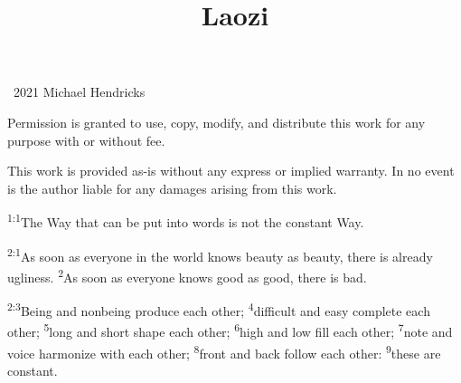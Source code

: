 \documentclass[openany,12pt,english]{book}
\title{Laozi}
\author{}
\date{}
\newenvironment{para}{\par\pretolerance=100\tolerance=200\setlength{\emergencystretch}{0.6em}\relax}{\par}
\begin{document}
\maketitle

{
\thispagestyle{empty}
\vspace*{\fill}
\begin{changemargin}{.8in}{.8in}
\begin{center}
\textcopyright{}~2021 Michael Hendricks

\vspace{0.5\baselineskip}

Permission is granted to use, copy, modify, and distribute
this work for any purpose with or without fee.

\vspace{0.5\baselineskip}

This work is provided as-is without any express or implied
warranty. In no event is the author liable for any damages
arising from this work.
\end{center}
\end{changemargin}
}
\clearpage{}

\clearpage{}

\markboth{}{}


\begin{para}
    \textsuperscript{1:1}\thinspace{}The Way that can be put in\-to words is not the con\-stant Way.
\end{para}

\bigskip{}

\begin{para}
    \textsuperscript{2:1}\thinspace{}As soon as eve\-ry\-one in the world knows beau\-ty as beau\-ty, there is al\-read\-y ug\-li\-ness.
    \textsuperscript{2}\thinspace{}As soon as eve\-ry\-one knows good as good, there is bad.
\end{para}

\begin{para}
    \textsuperscript{2:3}\thinspace{}Be\-ing and non\-be\-ing pro\-duce each oth\-er;
    \textsuperscript{4}\thinspace{}dif\-fi\-cult and eas\-y com\-plete each oth\-er;
    \textsuperscript{5}\thinspace{}long and short shape each oth\-er;
    \textsuperscript{6}\thinspace{}high and low fill each oth\-er;
    \textsuperscript{7}\thinspace{}note and voice har\-mo\-nize with each oth\-er;
    \textsuperscript{8}\thinspace{}front and back fol\-low each oth\-er:
    \textsuperscript{9}\thinspace{}these are con\-stant.
\end{para}
\end{document}
